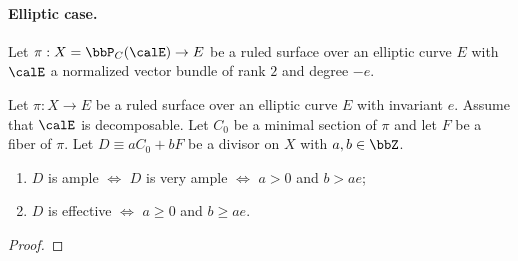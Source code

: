     \paragraph{Elliptic case.} Let \(\pi:X = \bbP_C(\calE) \to E\) be a ruled surface over an elliptic curve \(E\) with \(\calE\) a normalized vector bundle of rank \(2\) and degree \(-e\).

    \begin{theorem}\label{thm:positivity_of_divisors_on_decomposable_ruled_surface_over_elliptic_curve}
        Let \(\pi:X \to E\) be a ruled surface over an elliptic curve \(E\) with invariant \(e\).
        Assume that \(\calE\) is decomposable.
        Let \(C_0\) be a minimal section of \(\pi\) and let \(F\) be a fiber of \(\pi\). 
        Let \(D \equiv aC_0 + bF\) be a divisor on \(X\) with \(a,b \in \bbZ\).
        \begin{enumerate}
            \item \(D\) is ample \(\iff\) \(D\) is very ample \(\iff\) \(a > 0\) and \(b > ae\);
            \item \(D\) is effective \(\iff\) \(a \geq 0\) and \(b \geq ae\).
        \end{enumerate}
    \end{theorem}
    \begin{proof}
    \end{proof}

